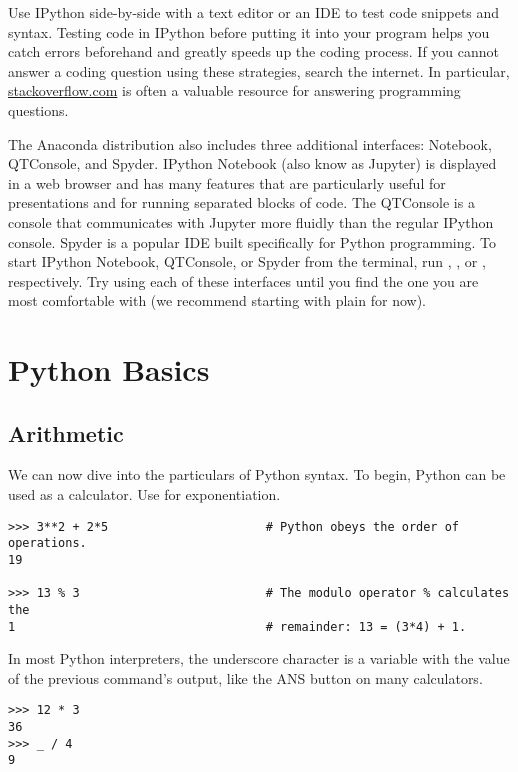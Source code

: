 Use IPython side-by-side with a text editor or an IDE to test code snippets and syntax.
Testing code in IPython before putting it into your program helps you catch errors beforehand and greatly speeds up the coding process.
If you cannot answer a coding question using these strategies, search the internet.
In particular, \href{http://stackoverflow.com/}{stackoverflow.com} is often a valuable resource for answering programming questions.

The Anaconda distribution also includes three additional interfaces: Notebook, QTConsole, and Spyder.
IPython Notebook (also know as Jupyter) is displayed in a web browser and has many features that are particularly useful for presentations and for running separated blocks of code.
The QTConsole is a console that communicates with Jupyter more fluidly than the regular IPython console.
Spyder is a popular IDE built specifically for Python programming.
To start IPython Notebook, QTConsole, or Spyder from the terminal, run , , or , respectively.
Try using each of these interfaces until you find the one you are most comfortable with (we recommend starting with plain  for now).

\section*{Python Basics} %

\subsection*{Arithmetic} %
We can now dive into the particulars of Python syntax.
To begin, Python can be used as a calculator.
Use \li{**} for exponentiation.

\begin{lstlisting}
>>> 3**2 + 2*5                      # Python obeys the order of operations.
19

>>> 13 % 3                          # The modulo operator % calculates the
1                                   # remainder: 13 = (3*4) + 1. 
\end{lstlisting}
In most Python interpreters, the underscore character \li{\_} is a variable with the value of the previous command's output, like the ANS button on many calculators.

\begin{lstlisting}
>>> 12 * 3
36
>>> _ / 4
9
\end{lstlisting}

